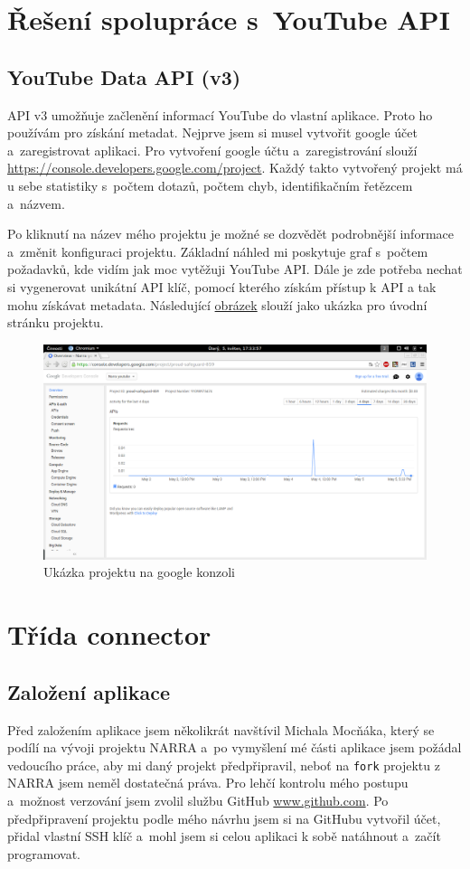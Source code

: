 \section{Řešení spolupráce s~YouTube API}
\subsection{YouTube Data API (v3)}
\par API v3\cite{apiv3} umožňuje začlenění informací YouTube do vlastní aplikace. Proto ho používám pro získání metadat. Nejprve jsem si musel vytvořit google účet a~zaregistrovat aplikaci. Pro vytvoření google účtu a~zaregistrování slouží \url{https://console.developers.google.com/project}\cite{googleconsole}. Každý takto vytvořený projekt má u sebe statistiky s~počtem dotazů, počtem chyb, identifikačním řetězcem a~názvem. 
\par Po kliknutí na název mého projektu je možné se dozvědět podrobnější informace a~změnit konfiguraci projektu. Základní náhled mi poskytuje graf s~počtem požadavků, kde vidím jak moc vytěžuji YouTube API\cite{apiv3}. Dále je zde potřeba nechat si vygenerovat unikátní API klíč, pomocí kterého získám přístup k API a tak mohu získávat metadata. Následující \hyperlink{consolesample}{obrázek} slouží jako ukázka pro úvodní stránku projektu.
\begin{figure}[h]
	\hypertarget{consolesample}{}
	\centering
	\includegraphics[width=\textwidth]{obrazova_priloha/my_projekt.png}
	\caption{Ukázka projektu na google konzoli}
\end{figure}

\section{Třída connector}
\subsection{Založení aplikace}
\par Před založením aplikace jsem několikrát navštívil Michala Mocňáka, který se podílí na vývoji projektu NARRA a~po vymyšlení mé části aplikace jsem požádal vedoucího práce, aby mi daný projekt předpřipravil, neboť na \texttt{fork} projektu z NARRA jsem neměl dostatečná práva. Pro lehčí kontrolu mého postupu a~možnost verzování jsem zvolil službu GitHub \url{www.github.com}\cite{git}. Po předpřipravení projektu podle mého návrhu jsem si na GitHubu vytvořil účet, přidal vlastní SSH klíč a~mohl jsem si celou aplikaci k sobě natáhnout a~začít programovat.

